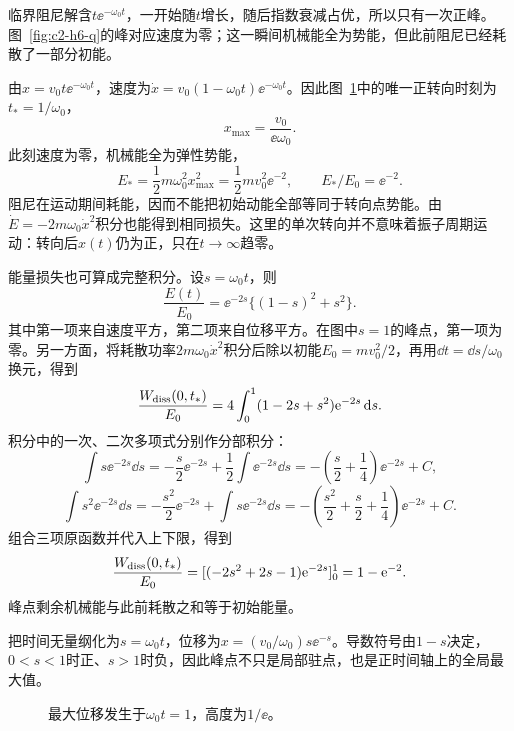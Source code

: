 \begin{solution}
临界阻尼解含$t\ee^{-\omega_0t}$，一开始随$t$增长，随后指数衰减占优，所以只有一次正峰。图~\ref{fig:c2-h6-q}的峰对应速度为零；这一瞬间机械能全为势能，但此前阻尼已经耗散了一部分初能。


由$x=v_0t\ee^{-\omega_0t}$，速度为$\dot x=v_0(1-\omega_0t)\ee^{-\omega_0t}$。因此图~\ref{fig:c2-h6-s}中的唯一正转向时刻为$t_*=1/\omega_0$，
\[\boxed{x_{\max}=\frac{v_0}{\ee\omega_0}}.
\]
此刻速度为零，机械能全为弹性势能，
\[E_* =\frac12m\omega_0^2x_{\max}^2=\frac12mv_0^2\ee^{-2},
\qquad \boxed{E_*/E_0=\ee^{-2}}.
\]
阻尼在运动期间耗能，因而不能把初始动能全部等同于转向点势能。由$\dot E=-2m\omega_0\dot x^2$积分也能得到相同损失。这里的单次转向并不意味着振子周期运动：转向后$x(t)$仍为正，只在$t\to\infty$趋零。


能量损失也可算成完整积分。设$s=\omega_0t$，则
\[\frac{E(t)}{E_0}=\ee^{-2s}\{(1-s)^2+s^2\}.\]
其中第一项来自速度平方，第二项来自位移平方。在图中$s=1$的峰点，第一项为零。另一方面，将耗散功率$2m\omega_0\dot x^2$积分后除以初能$E_0=mv_0^2/2$，再用$\dd t=\dd s/\omega_0$换元，得到
\[
\frac{W_{\rm diss}(0,t_*)}{E_0}=4\int_0^1(1-2s+s^2)\mathrm e^{-2s}\mathop{}\!\mathrm d s.
\]
积分中的一次、二次多项式分别作分部积分：
\[
\int s\ee^{-2s}\dd s=-\frac{s}{2}\ee^{-2s}+\frac12\int\ee^{-2s}\dd s
=-\left(\frac s2+\frac14\right)\ee^{-2s}+C,
\]
\[
\int s^2\ee^{-2s}\dd s=-\frac{s^2}{2}\ee^{-2s}+\int s\ee^{-2s}\dd s
=-\left(\frac{s^2}{2}+\frac s2+\frac14\right)\ee^{-2s}+C.
\]
组合三项原函数并代入上下限，得到
\[
\frac{W_{\rm diss}(0,t_*)}{E_0}
=[(-2s^2+2s-1)\mathrm e^{-2s}]_0^1=1-\mathrm e^{-2}.
\]
峰点剩余机械能与此前耗散之和等于初始能量。

把时间无量纲化为$s=\omega_0t$，位移为$x=(v_0/\omega_0)s\ee^{-s}$。导数符号由$1-s$决定，$0<s<1$时正、$s>1$时负，因此峰点不只是局部驻点，也是正时间轴上的全局最大值。

\begin{figure}[H]\centering
{}
\caption{最大位移发生于$\omega_0t=1$，高度为$1/\ee$。}\label{fig:c2-h6-s}
\end{figure}
\end{solution}

